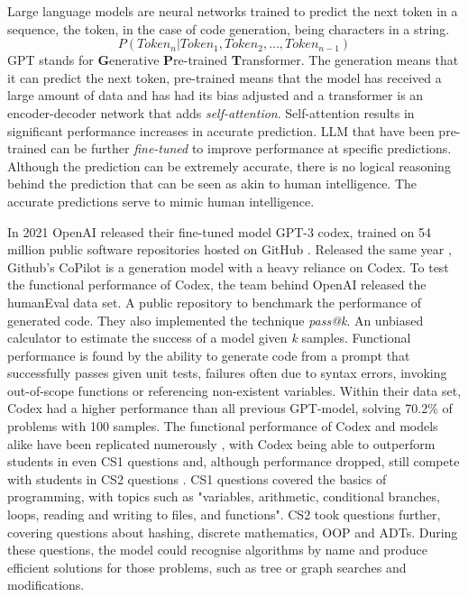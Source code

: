\documentclass[manuscript,screen,review,sigconf]{acmart}
\begin{document}
Large language models are neural networks trained to predict the next token in a sequence, the token, in the case of code generation, being characters in a string.
\[P(Token_n|Token_1,Token_2,...,Token_{n-1})\]
GPT stands for \textbf{G}enerative \textbf{P}re-trained \textbf{T}ransformer. The generation means that it can predict the next token, pre-trained means that the model has received a large amount of data and has had its bias adjusted and a transformer is an encoder-decoder network that adds \textit{self-attention}. Self-attention results in significant performance increases in accurate prediction. LLM that have been pre-trained can be further \textit{fine-tuned} to improve performance at specific predictions. Although the prediction can be extremely accurate, there is no logical reasoning behind the prediction that can be seen as akin to human intelligence. The accurate predictions serve to mimic human intelligence.


In 2021 OpenAI released their fine-tuned model GPT-3 codex, trained on 54 million public software repositories hosted on GitHub \cite{CodexRelPaper}. Released the same year \cite{GitHub_2021}, Github's CoPilot is a generation model with a heavy reliance on Codex. To test the functional performance of Codex, the team behind OpenAI released the humanEval data set. A public repository to benchmark the performance of generated code. They also implemented the technique \textit{pass@k}. An unbiased calculator to estimate the success of a model given \textit{k} samples. Functional performance is found by the ability to generate code from a prompt that successfully passes given unit tests, failures often due to syntax errors, invoking out-of-scope functions or referencing non-existent variables. Within their data set, Codex had a higher performance than all previous GPT-model, solving 70.2\% of problems with 100 samples. The functional performance of Codex and models alike have been replicated numerously \cite{SysEvaOfLLMofCode, PerformanceParsonProblems, CopilotSuggestionsEval, CoPilotForTeaching}, with Codex being able to outperform students in even CS1 questions and, although performance dropped, still compete with students in CS2 questions \cite{Codex_CS1_CS2_Test}. CS1 questions covered the basics of programming, with topics such as "variables, arithmetic, conditional branches, loops, reading and writing to files, and functions". CS2 took questions further, covering questions about hashing, discrete mathematics, OOP and ADTs. During these questions, the model could recognise algorithms by name and produce efficient solutions for those problems, such as tree or graph searches and modifications.
\end{document}
